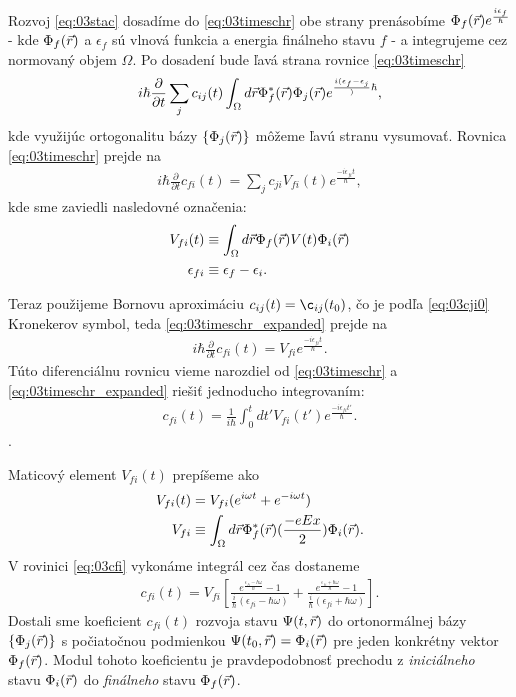 Rozvoj \eqref{eq:03stac} dosadíme do \eqref{eq:03timeschr} obe strany prenásobíme $\Phi_f(\vec{r})e^{\frac{i\epsilon_f}{\hbar}}$ - kde $\Phi_f(\vec{r})$ a $\epsilon_f$ sú vlnová funkcia a energia finálneho stavu $f$ - a integrujeme cez normovaný objem $\Omega$. Po dosadení bude ľavá strana rovnice \eqref{eq:03timeschr} 
\begin{align}
i\hbar\frac{\partial}{\partial t} \sum_j c_{ij}(t)\int_{\Omega} d\vec{r} \Phi_f^{*}(\vec{r})\Phi_j(\vec{r})e^{\frac{i(\epsilon_f-\epsilon_j}){\hbar}} \text{,}
\end{align}
kde využijúc ortogonalitu bázy $\{\Phi_j(\vec{r})\}$ môžeme ľavú stranu vysumovať. Rovnica \eqref{eq:03timeschr} prejde na 
\begin{align}
\label{eq:03timeschr_expanded}
i\hbar\frac{\partial}{\partial t}c_{fi}(t)=\sum_j c_{ji} V_{fi}(t)e^{\frac{-i \epsilon_{fi} t}{\hbar}} \mathrm{,}
\end{align}
kde sme zaviedli nasledovné označenia:
\begin{align}
V_{fi}(t) &\equiv \int_{\Omega}d\vec{r} \Phi_f(\vec{r})V(t)\Phi_i(\vec{r}) \\
\epsilon_{fi} &\equiv \epsilon_f - \epsilon_i \text{.}
\end{align}

Teraz použijeme Bornovu aproximáciu $c_{ij}(t)=\c_{ij}(t_0)$, čo je podľa \eqref{eq:03cji0} Kronekerov symbol, teda \eqref{eq:03timeschr_expanded} prejde na
\begin{align}
\label{eq:03born_appr}
i\hbar\frac{\partial}{\partial t}c_{fi}(t)=V_{fi}e^{\frac{-i\epsilon_{fi} t}{\hbar}}\mathrm{.}
\end{align}
Túto diferenciálnu rovnicu vieme narozdiel od \eqref{eq:03timeschr} a \eqref{eq:03timeschr_expanded} riešiť jednoducho integrovaním:
\begin{align}
\label{eq:03cfi}
c_{fi}(t) = \frac{1}{i\hbar} \int_0^t dt' V_{fi}(t')e^{\frac{-i\epsilon_{fi} t'}{\hbar}} \text{.}
\end{align}.

Maticový element $V_{fi}(t)$ prepíšeme ako
\begin{align}
V_{fi}(t)&=V_{fi}(e^{i\omega t}+e^{-i\omega t})\\
\label{eq:03Vfi}
V_{fi}&\equiv \int_{\Omega} d\vec{r} \Phi_f^{*}(\vec{r})(\frac{-eEx}{2})\Phi_i(\vec{r}) \text{.}
\end{align}
V rovinici \eqref{eq:03cfi} vykonáme integrál cez čas dostaneme
\begin{align}
\label{eq:03cfi_final}
c_{fi}(t)=V_{fi}[\frac{e^{\frac{\epsilon_{fi} - \hbar\omega}{\hbar}}-1}{\frac{i}{\hbar}(\epsilon_{fi}-\hbar\omega)}+\frac{e^{\frac{\epsilon_{fi} + \hbar\omega}{\hbar}}-1}{\frac{i}{\hbar}(\epsilon_{fi}+\hbar\omega)}] \text{.}
\end{align}
Dostali sme koeficient $c_{fi}(t)$ rozvoja  stavu $\Psi(t,\vec{r})$ do ortonormálnej bázy $\{\Phi_j(\vec{r})\}$ s počiatočnou podmienkou $\Psi(t_0,\vec{r})=\Phi_i(\vec{r})$ pre jeden konkrétny vektor $\Phi_f(\vec{r})$. Modul tohoto koeficientu je pravdepodobnosť prechodu z {\it iniciálneho} stavu $\Phi_i(\vec{r})$ do {\it finálneho} stavu $\Phi_f(\vec{r})$.


